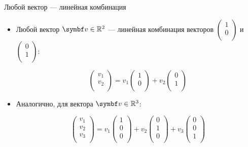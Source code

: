\begin{frame}{Любой вектор — линейная комбинация}


\begin{itemize}[<+->]
  \item Любой вектор $\bv \in \R^2$ — линейная комбинация векторов $\begin{pmatrix}
    1 \\
    0 \\
  \end{pmatrix}$ и $\begin{pmatrix}
    0 \\
    1 \\
  \end{pmatrix}$:

\[
\begin{pmatrix}
  v_1 \\
  v_2 \\
\end{pmatrix} = 
v_1 \begin{pmatrix}
    1 \\
    0 \\
  \end{pmatrix} + 
  v_2 \begin{pmatrix}
    0 \\
    1 \\
  \end{pmatrix}
\]

\item Аналогично, для вектора  $\bv \in \R^3$:

\[
\begin{pmatrix}
v_1 \\
v_2 \\
v_3 \\
\end{pmatrix} = 
v_1 \begin{pmatrix}
  1 \\
  0 \\
  0 \\
\end{pmatrix} + 
v_2 \begin{pmatrix}
  0 \\
  1 \\
  0 \\
\end{pmatrix} +
v_3 \begin{pmatrix}
  0 \\
  0 \\
  1 \\
\end{pmatrix} 
\]



\end{itemize}
  

\end{frame}



